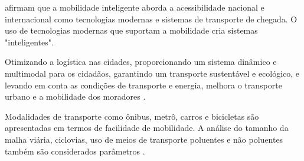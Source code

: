 

 afirmam que a mobilidade inteligente aborda a acessibilidade nacional e internacional como tecnologias modernas e sistemas de transporte de chegada. O uso de tecnologias modernas que suportam a mobilidade cria sistemas "inteligentes".

Otimizando a logística nas cidades, proporcionando um sistema dinâmico e multimodal para os cidadãos, garantindo um transporte sustentável e ecológico, e levando em conta as condições de transporte e energia, melhora o transporte urbano e a mobilidade dos moradores \cite{neirotti}.

Modalidades de transporte como ônibus, metrô, carros e bicicletas são apresentadas em termos de facilidade de mobilidade. A análise do tamanho da malha viária, ciclovias, uso de meios de transporte poluentes e não poluentes também são considerados parâmetros \cite{kon}.



